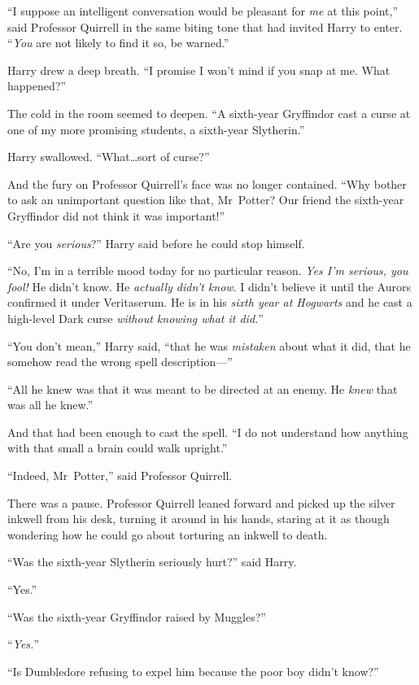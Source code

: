 “I suppose an intelligent conversation would be pleasant for \emph{me} at this point,” said Professor Quirrell in the same biting tone that had invited Harry to enter. “\emph{You} are not likely to find it so, be warned.”

Harry drew a deep breath. “I promise I won’t mind if you snap at me. What happened?”

The cold in the room seemed to deepen. “A sixth-year Gryffindor cast a curse at one of my more promising students, a sixth-year Slytherin.”

Harry swallowed. “What…sort of curse?”

And the fury on Professor Quirrell’s face was no longer contained. “Why bother to ask an unimportant question like that, Mr~Potter? Our friend the sixth-year Gryffindor did not think it was important!”

“Are you \emph{serious}?” Harry said before he could stop himself.

“No, I’m in a terrible mood today for no particular reason. \emph{Yes I’m serious, you fool!} He didn’t know. He \emph{actually didn’t know}. I didn’t believe it until the Aurors confirmed it under Veritaserum. He is in his \emph{sixth year at Hogwarts} and he cast a high-level Dark curse \emph{without knowing what it did.}”

“You don’t mean,” Harry said, “that he was \emph{mistaken} about what it did, that he somehow read the wrong spell description—”

“All he knew was that it was meant to be directed at an enemy. He \emph{knew} that was all he knew.”

And that had been enough to cast the spell. “I do not understand how anything with that small a brain could walk upright.”

“Indeed, Mr~Potter,” said Professor Quirrell.

There was a pause. Professor Quirrell leaned forward and picked up the silver inkwell from his desk, turning it around in his hands, staring at it as though wondering how he could go about torturing an inkwell to death.

“Was the sixth-year Slytherin seriously hurt?” said Harry.

“Yes.”

“Was the sixth-year Gryffindor raised by Muggles?”

“\emph{Yes.}”

“Is Dumbledore refusing to expel him because the poor boy didn’t know?”

